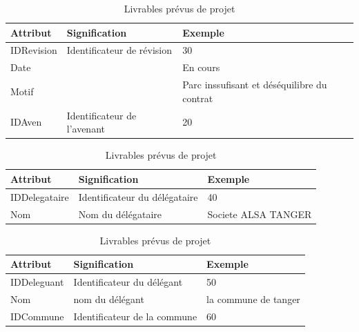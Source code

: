 \documentclass[a4paper]{report}
\begin{document}
\begin{doublespace}
	\begin{table}[H]
		\begin{center}
			\begin{tabularx}{17cm}{|X|X|X|}
				\hline
				\textbf{Attribut} & \textbf{Signification}      &
				\textbf{Exemple}                                                                              \\
				\hline
				IDRevision        & Identificateur de révision  & 30                                          \\
				\hline
				Date              &                             & En cours                                    \\
				\hline
				Motif             &                             & Parc inssufisant et déséquilibre du contrat \\
				\hline
				IDAven            & Identificateur de l'avenant & 20                                          \\
				\hline
			\end{tabularx}
			\caption{Livrables prévus de projet}
		\end{center}
	\end{table}

	\begin{table}[H]
		\begin{center}
			\begin{tabularx}{17.5cm}{|X|X|X|}
				\hline
				\textbf{Attribut} & \textbf{Signification}        &
				\textbf{Exemple}                                                        \\
				\hline
				IDDelegataire     & Identificateur du délégataire & 40                  \\
				\hline
				Nom               & Nom du délégataire            & Societe ALSA TANGER \\
				\hline
			\end{tabularx}
			\caption{Livrables prévus de projet}
		\end{center}
	\end{table}

	\begin{table}[H]
		\begin{center}
			\begin{tabularx}{17.5cm}{|X|X|X|}
				\hline
				\textbf{Attribut} & \textbf{Signification}       &
				\textbf{Exemple}                                                        \\
				\hline
				IDDeleguant       & Identificateur du délégant   & 50                   \\
				\hline
				Nom               & nom du délégant              & la commune de tanger \\
				\hline
				IDCommune         & Identificateur de la commune & 60                   \\
				\hline
			\end{tabularx}
			\caption{Livrables prévus de projet}
		\end{center}
	\end{table}


\end{doublespace}
\end{document}
